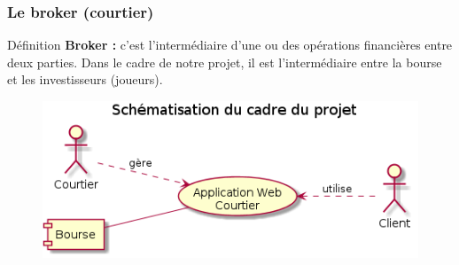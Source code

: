 
\begin{frame}
    \frametitle{Le broker (courtier)}
      \begin{block}{Définition}
	   \textbf{Broker :} c'est l'intermédiaire d'une ou des opérations financières entre deux parties. Dans le cadre de notre projet, il est l'intermédiaire entre la bourse et les investisseurs (joueurs).
      \end{block}

      \begin{figure}
	  \includegraphics[scale=0.4]{images/schemaProjet.png}
      \end{figure}


\end{frame}
